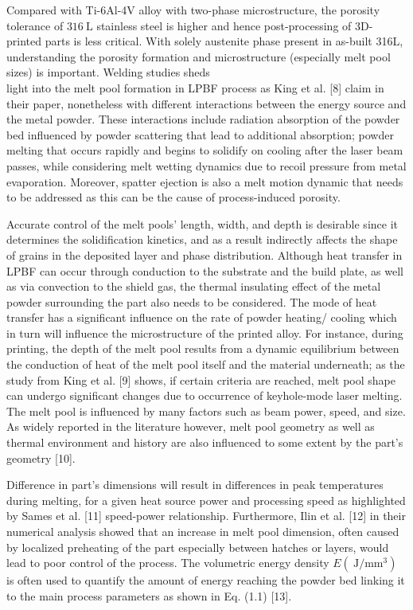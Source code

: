 \documentclass[10pt]{article}
\begin{document}
Compared with Ti-6Al-4V alloy with two-phase microstructure, the porosity tolerance of $316 \mathrm{~L}$ stainless steel is higher and hence post-processing of 3D-printed parts is less critical. With solely austenite phase present in as-built 316L, understanding the porosity formation and microstructure (especially melt pool sizes) is important. Welding studies sheds\\
light into the melt pool formation in LPBF process as King et al. [8] claim in their paper, nonetheless with different interactions between the energy source and the metal powder. These interactions include radiation absorption of the powder bed influenced by powder scattering that lead to additional absorption; powder melting that occurs rapidly and begins to solidify on cooling after the laser beam passes, while considering melt wetting dynamics due to recoil pressure from metal evaporation. Moreover, spatter ejection is also a melt motion dynamic that needs to be addressed as this can be the cause of process-induced porosity.

Accurate control of the melt pools' length, width, and depth is desirable since it determines the solidification kinetics, and as a result indirectly affects the shape of grains in the deposited layer and phase distribution. Although heat transfer in LPBF can occur through conduction to the substrate and the build plate, as well as via convection to the shield gas, the thermal insulating effect of the metal powder surrounding the part also needs to be considered. The mode of heat transfer has a significant influence on the rate of powder heating/ cooling which in turn will influence the microstructure of the printed alloy. For instance, during printing, the depth of the melt pool results from a dynamic equilibrium between the conduction of heat of the melt pool itself and the material underneath; as the study from King et al. [9] shows, if certain criteria are reached, melt pool shape can undergo significant changes due to occurrence of keyhole-mode laser melting. The melt pool is influenced by many factors such as beam power, speed, and size. As widely reported in the literature however, melt pool geometry as well as thermal environment and history are also influenced to some extent by the part's geometry [10].

Difference in part's dimensions will result in differences in peak temperatures during melting, for a given heat source power and processing speed as highlighted by Sames et al. [11] speed-power relationship. Furthermore, Ilin et al. [12] in their numerical analysis showed that an increase in melt pool dimension, often caused by localized preheating of the part especially between hatches or layers, would lead to poor control of the process. The volumetric energy density $E\left(\mathrm{~J} / \mathrm{mm}^{3}\right)$ is often used to quantify the amount of energy reaching the powder bed linking it to the main process parameters as shown in Eq. (1.1) [13].
\end{document}

